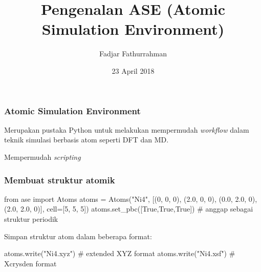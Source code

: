 \documentclass[bahasa,10pt]{beamer}
\begin{document}
\title{Pengenalan ASE (Atomic Simulation Environment)}
\author{Fadjar Fathurrahman}
\date{23 April 2018}

\frame{\titlepage}

\begin{frame}
\frametitle{Atomic Simulation Environment}

Merupakan pustaka Python untuk melakukan mempermudah \textit{workflow}
dalam teknik simulasi berbasis atom seperti DFT dan MD.

Mempermudah \textit{scripting}

\end{frame}



\begin{frame}[fragile]
\frametitle{Membuat struktur atomik}

\begin{pythoncode}
from ase import Atoms
atoms = Atoms("Ni4", [(0, 0, 0), (2.0, 0, 0), (0.0, 2.0, 0), (2.0, 2.0, 0)],
               cell=[5, 5, 5])
atoms.set_pbc([True,True,True])  # anggap sebagai struktur periodik
\end{pythoncode}

Simpan struktur atom dalam beberapa format:
\begin{pythoncode}
atoms.write("Ni4.xyz")  # extended XYZ format
atoms.write("Ni4.xsf")  # Xcrysden format
\end{pythoncode}

\end{frame}
\end{document}
